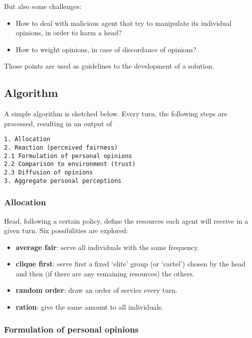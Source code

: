 \documentclass[conference,compsoc]{IEEEtran}
\begin{document}
But also some challenges:
\begin{itemize}
    \item How to deal with malicious agent that try to manipulate its individual opinions, in order to harm a head?
    \item How to weight opinions, in case of discordance of opinions?
\end{itemize}

Those points are used as guidelines to the development of a solution.

\subsection{Algorithm}

A simple algorithm is sketched below. Every turn, the following steps are processed, resulting in an output of

\begin{verbatim}
1. Allocation 
2. Reaction (perceived fairness)
2.1 Formulation of personal opinions
2.2 Comparison to environment (trust)
2.3 Diffusion of opinions
3. Aggregate personal perceptions
\end{verbatim}


\subsubsection*{Allocation}

Head, following a certain policy, define the resources each agent will receive in a given turn. Six possibilities are explored:


\begin{itemize}
    \item \textbf{average fair}: serve all individuals with the same frequency.
    \item \textbf{clique first}: serve first a fixed `elite' group (or `cartel') chosen by the head and then (if there are any remaining resources) the others.
    \item \textbf{random order}: draw an order of service every turn.
    \item \textbf{ration}: give the same amount to all individuals.
\end{itemize}



\subsubsection*{Formulation of personal opinions}
\end{document}
